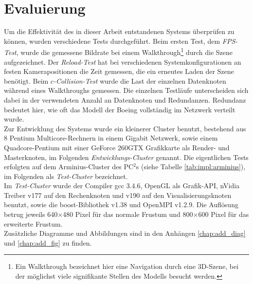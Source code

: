 \chapter{Evaluierung}
\label{chap:eval}
%
%
%

Um die Effektivität des in dieser Arbeit entstandenen Systems überprüfen zu können, wurden verschiedene Tests durchgeführt.
Beim ersten Test, dem \textit{FPS-Test}, wurde die gemessene Bildrate bei einem Walkthrough\footnote{Ein Walkthrough bezeichnet hier eine Navigation durch eine 3D-Szene, bei der möglichst viele signifikante Stellen des Modells besucht werden.} durch die Szene aufgezeichnet. Der \textit{Reload-Test} hat bei verschiedenen Systemkonfigurationen an festen Kamerapositionen die Zeit gemessen, die ein erneutes Laden der Szene benötigt. Beim \textit{$c$-Collision-Test} wurde die Last der einzelnen Datenknoten während eines Walkthroughs gemessen. Die einzelnen Testläufe unterscheiden sich dabei in der verwendeten Anzahl an Datenknoten und Redundanzen. Redundanz bedeutet hier, wie oft das Modell der Boeing vollständig im Netzwerk verteilt wurde. \\
Zur Entwicklung des Systems wurde ein kleinerer Cluster benutzt, bestehend aus 8 Pentium Multicore-Rechnern in einem Gigabit Netzwerk, sowie einem Quadcore-Pentium mit einer GeForce 260GTX Grafikkarte als Render- und Masterknoten, im Folgenden \textit{Entwicklungs-Cluster} genannt. Die eigentlichen Tests erfolgten auf dem Arminius-Cluster des PC$^2$s (siehe Tabelle \ref{tab:impl:arminius}), im Folgenden als \textit{Test-Cluster} bezeichnet.\\
Im \textit{Test-Cluster} wurde der Compiler gcc 3.4.6, OpenGL als Grafik-API, nVidia Treiber v177 auf den Rechenknoten und v190 auf den Visualisierungsknoten benutzt, sowie die boost-Bibliothek v1.38 und OpenMPI v1.2.9. Die Auflösung betrug jeweils 640$\times$480 Pixel für das normale Frustum und 800$\times$600 Pixel für das erweiterte Frustum.\\
Zusätzliche Diagramme und Abbildungen sind in den Anhängen \ref{chap:add_diag} und \ref{chap:add_fig} zu finden.

